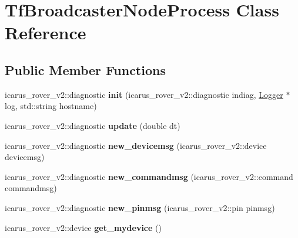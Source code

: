 \hypertarget{classTfBroadcasterNodeProcess}{}\section{Tf\+Broadcaster\+Node\+Process Class Reference}
\label{classTfBroadcasterNodeProcess}
\subsection*{Public Member Functions}
\begin{DoxyCompactItemize}
\item 
\mbox{\label{classTfBroadcasterNodeProcess_a84d179e923f6891f1df2272409e2c8e8}} 
icarus\+\_\+rover\+\_\+v2\+::diagnostic {\bfseries init} (icarus\+\_\+rover\+\_\+v2\+::diagnostic indiag, \hyperlink{classLogger}{Logger} $\ast$log, std\+::string hostname)
\item 
\mbox{\label{classTfBroadcasterNodeProcess_a6c1a571c6e432057331fb8bdd1fe5314}} 
icarus\+\_\+rover\+\_\+v2\+::diagnostic {\bfseries update} (double dt)
\item 
\mbox{\label{classTfBroadcasterNodeProcess_a7157de39147ce7bc27c0e0f63fbf05e9}} 
icarus\+\_\+rover\+\_\+v2\+::diagnostic {\bfseries new\+\_\+devicemsg} (icarus\+\_\+rover\+\_\+v2\+::device devicemsg)
\item 
\mbox{\label{classTfBroadcasterNodeProcess_adad25e34c62a33a9f559128d80db151d}} 
icarus\+\_\+rover\+\_\+v2\+::diagnostic {\bfseries new\+\_\+commandmsg} (icarus\+\_\+rover\+\_\+v2\+::command commandmsg)
\item 
\mbox{\label{classTfBroadcasterNodeProcess_a0c0e982465b2eacf6bb219b3d218ada8}} 
icarus\+\_\+rover\+\_\+v2\+::diagnostic {\bfseries new\+\_\+pinmsg} (icarus\+\_\+rover\+\_\+v2\+::pin pinmsg)
\item 
\mbox{\label{classTfBroadcasterNodeProcess_a2e4e69e1b68448e2b1c214778f5b6e5b}} 
icarus\+\_\+rover\+\_\+v2\+::device {\bfseries get\+\_\+mydevice} ()
\item 
\mbox{\label{classTfBroadcasterNodeProcess_a423d97b1b2c7ab8bedaa017da41ce306}} 

\end{DoxyCompactItemize}
